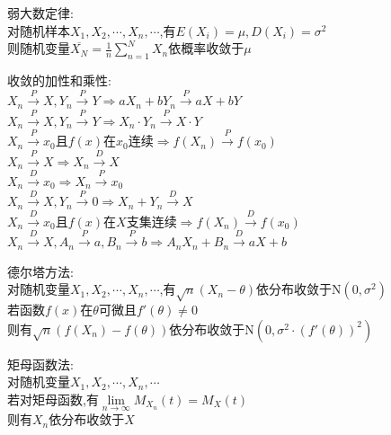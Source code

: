 \begin{dingli}
弱大数定律:\\
对随机样本$X_1,X_2,\cdots,X_n,\cdots$,有$E(X_i)=\mu,D(X_i)=\sigma^2$\\
则随机变量$\overline{X_N}=\frac{1}{n}\sum\limits_{n=1}^{N}X_n$依概率收敛于$\mu$
\end{dingli}

\begin{dingli}
收敛的加性和乘性:\\
$X_n\stackrel{P}{\rightarrow}X,Y_n\stackrel{P}{\rightarrow}Y\Rightarrow aX_n+bY_n\stackrel{P}{\rightarrow}aX+bY$\\
$X_n\stackrel{P}{\rightarrow}X,Y_n\stackrel{P}{\rightarrow}Y\Rightarrow X_n\cdot Y_n\stackrel{P}{\rightarrow}X\cdot Y$\\
$X_n\stackrel{P}{\rightarrow}x_0$且$f(x)$在$x_0$连续$\Rightarrow f(X_n)\stackrel{P}{\rightarrow}f(x_0)$\\
$X_n\stackrel{P}{\rightarrow}X\Rightarrow X_n\stackrel{D}{\rightarrow}X$\\
$X_n\stackrel{D}{\rightarrow}x_0\Rightarrow X_n\stackrel{P}{\rightarrow}x_0$\\
$X_n\stackrel{D}{\rightarrow}X,Y_n\stackrel{P}{\rightarrow}0\Rightarrow X_n+Y_n\stackrel{D}{\rightarrow}X$\\
$X_n\stackrel{D}{\rightarrow}x_0$且$f(x)$在$X$支集连续$\Rightarrow f(X_n)\stackrel{D}{\rightarrow}f(x_0)$\\
$X_n\stackrel{D}{\rightarrow}X,A_n\stackrel{P}{\rightarrow}a,B_n\stackrel{P}{\rightarrow}b\Rightarrow A_nX_n+B_n\stackrel{D}{\rightarrow}aX+b$\\
\end{dingli}

\begin{dingli}
德尔塔方法:\\
对随机变量$X_1,X_2,\cdots,X_n,\cdots$,有$\sqrt{n}(X_n-\theta)$依分布收敛于N$(0,\sigma^2)$\\
若函数$f(x)$在$\theta$可微且$f'(\theta)\neq 0$\\
则有$\sqrt{n}(f(X_n)-f(\theta))$依分布收敛于N$(0,\sigma^2\cdot(f'(\theta))^2)$
\end{dingli}

\begin{dingli}
矩母函数法:\\
对随机变量$X_1,X_2,\cdots,X_n,\cdots$\\
若对矩母函数,有$\lim\limits_{n\to\infty}M_{X_n}(t)=M_{X}(t)$\\
则有$X_n$依分布收敛于$X$
\end{dingli}

